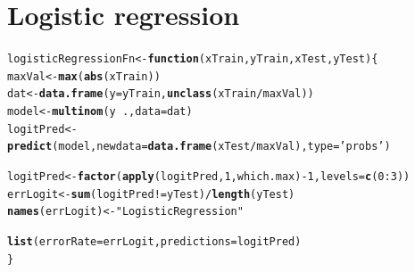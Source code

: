 \documentclass[a4paper,draft=false]{scrreprt}\usepackage[]{graphicx}\usepackage[]{color}
\makeatletter
\newcommand{\hlnum}[1]{\textcolor[rgb]{0.686,0.059,0.569}{#1}}%
\newcommand{\hlstr}[1]{\textcolor[rgb]{0.192,0.494,0.8}{#1}}%
\newcommand{\hlopt}[1]{\textcolor[rgb]{0,0,0}{#1}}%
\newcommand{\hlstd}[1]{\textcolor[rgb]{0.345,0.345,0.345}{#1}}%
\newcommand{\hlkwa}[1]{\textcolor[rgb]{0.161,0.373,0.58}{\textbf{#1}}}%
\newcommand{\hlkwb}[1]{\textcolor[rgb]{0.69,0.353,0.396}{#1}}%
\newcommand{\hlkwc}[1]{\textcolor[rgb]{0.333,0.667,0.333}{#1}}%
\newcommand{\hlkwd}[1]{\textcolor[rgb]{0.737,0.353,0.396}{\textbf{#1}}}%
\newenvironment{kframe}{%
 \def\at@end@of@kframe{}%
 \ifinner\ifhmode%
  \def\at@end@of@kframe{\end{minipage}}%
  \begin{minipage}{\columnwidth}%
 \fi\fi%
 \def\FrameCommand##1{\hskip\@totalleftmargin \hskip-\fboxsep
 \colorbox{shadecolor}{##1}\hskip-\fboxsep
     \hskip-\linewidth \hskip-\@totalleftmargin \hskip\columnwidth}%
 \MakeFramed {\advance\hsize-\width
   \@totalleftmargin\z@ \linewidth\hsize
   \@setminipage}}%
 {\par\unskip\endMakeFramed%
 \at@end@of@kframe}
\newenvironment{knitrout}{}{} %
\makeatother
\begin{document}
\section{Logistic regression} %
\begin{knitrout}
\color{fgcolor}\begin{kframe}
\begin{alltt}
\hlstd{logisticRegressionFn} \hlkwb{<-} \hlkwa{function}\hlstd{(}\hlkwc{xTrain}\hlstd{,} \hlkwc{yTrain}\hlstd{,} \hlkwc{xTest}\hlstd{,} \hlkwc{yTest}\hlstd{)\{}
    \hlstd{maxVal} \hlkwb{<-} \hlkwd{max}\hlstd{(}\hlkwd{abs}\hlstd{(xTrain))}
    \hlstd{dat} \hlkwb{<-} \hlkwd{data.frame}\hlstd{(}\hlkwc{y} \hlstd{= yTrain,} \hlkwd{unclass}\hlstd{(xTrain}\hlopt{/}\hlstd{maxVal))}
    \hlstd{model} \hlkwb{<-} \hlkwd{multinom}\hlstd{(y} \hlopt{~} \hlstd{.,} \hlkwc{data} \hlstd{= dat)}
    \hlstd{logitPred} \hlkwb{<-} \hlkwd{predict}\hlstd{(model,} \hlkwc{newdata}\hlstd{=} \hlkwd{data.frame}\hlstd{(xTest}\hlopt{/}\hlstd{maxVal),} \hlkwc{type}\hlstd{=}\hlstr{'probs'}\hlstd{)}

    \hlstd{logitPred} \hlkwb{<-} \hlkwd{factor}\hlstd{(}\hlkwd{apply}\hlstd{(logitPred,} \hlnum{1}\hlstd{, which.max)} \hlopt{-} \hlnum{1}\hlstd{,} \hlkwc{levels} \hlstd{=} \hlkwd{c}\hlstd{(}\hlnum{0}\hlopt{:}\hlnum{3}\hlstd{))}
    \hlstd{errLogit} \hlkwb{<-} \hlkwd{sum}\hlstd{(logitPred} \hlopt{!=} \hlstd{yTest)} \hlopt{/} \hlkwd{length}\hlstd{(yTest)}
    \hlkwd{names}\hlstd{(errLogit)} \hlkwb{<-} \hlstr{"LogisticRegression"}

    \hlkwd{list}\hlstd{(}\hlkwc{errorRate} \hlstd{= errLogit,} \hlkwc{predictions} \hlstd{= logitPred)}
\hlstd{\}}
\end{alltt}
\end{kframe}
\end{knitrout}
\end{document}
